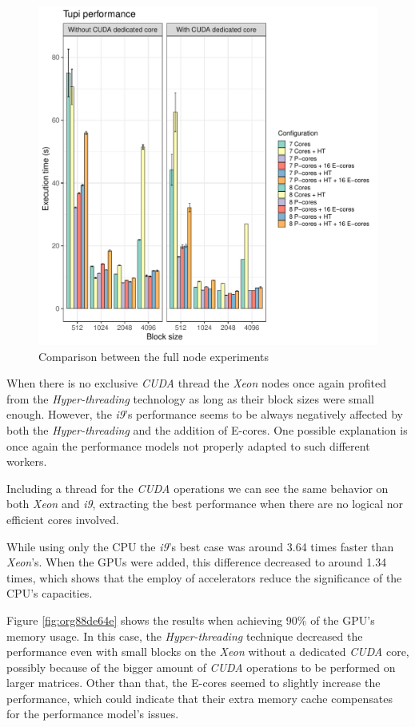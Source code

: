 \documentclass[ppgc,english]{iiufrgs}
\begin{document}
\begin{figure}[htbp]
\centering
\includegraphics[width=.9\linewidth]{./figures/tupi.pdf}
\caption{\label{fig:org89d910c}Comparison between the full node experiments}
\end{figure}

When there is no exclusive \emph{CUDA} thread the \emph{Xeon} nodes once again profited from the \emph{Hyper-threading} technology as long as their block
sizes were small enough. However, the \emph{i9}'s performance seems to be always negatively affected by both the \emph{Hyper-threading} and the
addition of E-cores. One possible explanation is once again the performance models not properly adapted to such different workers.

Including a thread for the \emph{CUDA} operations we can see the same behavior on both \emph{Xeon} and \emph{i9}, extracting the best performance when
there are no logical nor efficient cores involved.

While using only the CPU the \emph{i9}'s best case was around 3.64 times faster than \emph{Xeon}'s. When the GPUs were added, this difference
decreased to around 1.34 times, which shows that the employ of accelerators reduce the significance of the CPU's capacities.

Figure \ref{fig:org88de64e} shows the results when achieving 90\% of the GPU's memory usage. In this case, the \emph{Hyper-threading} technique decreased
the performance even with small blocks on the \emph{Xeon} without a dedicated \emph{CUDA} core, possibly because of the bigger amount of \emph{CUDA} operations
to be performed on larger matrices. Other than that, the E-cores seemed to slightly increase the performance, which could indicate that
their extra memory cache compensates for the performance model's issues.
\end{document}
